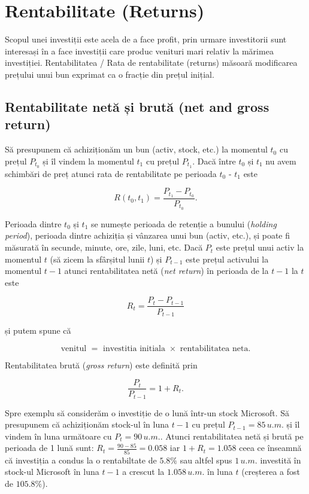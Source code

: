 \documentclass[]{article}
\begin{document}
\section{Rentabilitate (Returns)}\label{rentabilitate-returns}

Scopul unei investiții este acela de a face profit, prin urmare
investitorii sunt interesași în a face investiții care produc venituri
mari relativ la mărimea investiției. Rentabilitatea / Rata de
rentabilitate (returns) măsoară modificarea prețului unui bun exprimat
ca o fracție din prețul inițial.

\subsection{Rentabilitate netă și brută (net and gross
return)}\label{rentabilitate-neta-si-bruta-net-and-gross-return}

Să presupunem că achiziționăm un bun (activ, stock, etc.) la momentul
\(t_0\) cu prețul \(P_{t_0}\) și îl vindem la momentul \(t_1\) cu prețul
\(P_{t_1}\). Dacă între \(t_0\) și \(t_1\) nu avem schimbări de preț
atunci rata de rentabilitate pe perioada \(t_0\) - \(t_1\) este

\[
  R(t_0,t_1) = \frac{P_{t_1} - P_{t_0}}{P_{t_0}}.
\]

Perioada dintre \(t_0\) și \(t_1\) se numește perioada de retenție a
bunului (\emph{holding period}), perioada dintre achiziția și vânzarea
unui bun (activ, etc.), și poate fi măsurată în secunde, minute, ore,
zile, luni, etc. Dacă \(P_t\) este prețul unui activ la momentul \(t\)
(să zicem la sfârșitul lunii \(t\)) și \(P_{t-1}\) este prețul activului
la momentul \(t-1\) atunci rentabilitatea netă (\emph{net return}) în
perioada de la \(t-1\) la \(t\) este

\[
  R_t = \frac{P_{t} - P_{t-1}}{P_{t-1}}
\]

și putem spune că

\[
  \text{venitul } = \text{ investitia initiala } \times \text{ rentabilitatea neta}.
\]

Rentabilitatea brută (\emph{gross return}) este definită prin

\[
  \frac{P_{t}}{P_{t-1}} = 1 + R_t.
\]

Spre exemplu să considerăm o investiție de o lună într-un stock
Microsoft. Să presupunem că achiziționăm stock-ul în luna \(t-1\) cu
prețul \(P_{t-1} = 85\, u.m.\) și îl vindem în luna următoare cu
\(P_{t} = 90\, u.m.\). Atunci rentabilitatea netă și brută pe perioada
de 1 lună sunt: \(R_t = \frac{90-85}{85} = 0.058\) iar \(1+R_t = 1.058\)
ceea ce înseamnă că investiția a condus la o rentabiltate de \(5.8\%\)
sau altfel spus \(1\,u.m.\) investită în stock-ul Microsoft în luna
\(t-1\) a crescut la \(1.058\,u.m.\) în luna \(t\) (creșterea a fost de
\(105.8\%\)).
\end{document}
